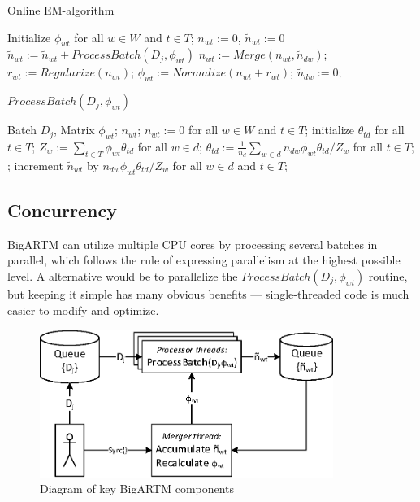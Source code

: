 \documentclass{llncs}
\begin{document}
\begin{algorithm}
\caption{Online EM-algorithm}
\label{fig:plsa_alg}
\begin{algorithmic}[1]
\STATE Initialize $\phi_{wt}$ for all $w \in W$ and $t \in T$;
\STATE $n_{wt} := 0$, $\tilde n_{wt} := 0$
    \STATE $\tilde n_{wt} := \tilde n_{wt} + ProcessBatch(D_j, \phi_{wt})$
        \STATE $n_{wt} := Merge(n_{wt}, \tilde n_{dw})$;
        \STATE $r_{wt} := Regularize(n_{wt})$;
        \STATE $\phi_{wt} := Normalize(n_{wt} + r_{wt})$;
        \STATE $\tilde n_{dw} := 0$;
    \ENDIF
\ENDFOR
\end{algorithmic}
\end{algorithm}

\begin{algorithm}
\caption{$ProcessBatch(D_j, \phi_{wt})$}
\label{fig:plsa_alg}
\begin{algorithmic}[1]
\REQUIRE Batch $D_j$, Matrix $\phi_{wt}$;
\ENSURE $n_{wt}$;
\STATE $n_{wt} := 0$ for all $w \in W$ and $t \in T$;
	\STATE initialize $\theta_{td}$ for all $t \in T$;
	\REPEAT
		\STATE $Z_w := \sum_{t \in T} \phi_{wt} \theta_{td}$ for all $w \in d$;
		\STATE $\theta_{td} := \frac{1}{n_d} \sum_{w \in d} n_{dw} \phi_{wt} \theta_{td} / Z_w$
               for all $t \in T$;
	;
	\STATE increment $\tilde n_{wt}$ by $n_{dw} \phi_{wt} \theta_{td} / Z_w$
           for all $w \in d$ and $t \in T$;
\ENDFOR
\end{algorithmic}
\end{algorithm}

\subsection{Concurrency}
BigARTM can utilize multiple CPU cores by processing several batches in parallel,
which follows the rule of expressing parallelism at the highest possible level.
A alternative would be to parallelize the $ProcessBatch(D_j, \phi_{wt})$ routine,
but keeping it simple has many obvious benefits --- single-threaded code is much easier to modify and optimize.

\begin{figure}[h!]
\begin{centering}
\includegraphics[height=48mm]{diagramm_artm_core.eps}
\caption{Diagram of key BigARTM components}
\label{fig:diagramm_artm_core}
\end{centering}
\end{figure}
\end{document}
